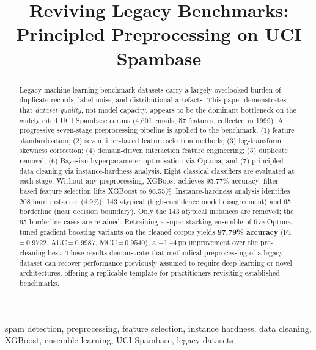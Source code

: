 \documentclass[conference]{IEEEtran}
\begin{document}
\title{Reviving Legacy Benchmarks: Principled Preprocessing on UCI Spambase }

\author{%
}

\maketitle

\begin{abstract}
Legacy machine learning benchmark datasets carry a largely
overlooked burden of duplicate records, label noise, and distributional artefacts. This paper demonstrates that \emph{dataset quality}, not model capacity, appears to be the dominant bottleneck on
the widely cited UCI Spambase corpus (4,601 emails, 57
features, collected in 1999). A progressive seven-stage
preprocessing pipeline is applied to the benchmark. (1) feature
standardisation; (2) seven filter-based feature selection
methods; (3) log-transform skewness correction; (4) domain-driven
interaction feature engineering; (5) duplicate removal; (6)
Bayesian hyperparameter optimisation via Optuna; and (7)
principled data cleaning via instance-hardness analysis. Eight
classical classifiers are evaluated at each stage. Without any
preprocessing, XGBoost achieves 95.77\% accuracy; filter-based feature selection lifts
XGBoost to 96.55\%. Instance-hardness analysis identifies 208
hard instances (4.9\%): 143 atypical (high-confidence model
disagreement) and 65 borderline (near decision boundary).
Only the 143 atypical instances are removed; the 65 borderline
cases are retained. Retraining a super-stacking ensemble of five
Optuna-tuned gradient boosting variants on the cleaned corpus
yields \textbf{97.79\% accuracy} (F1\,=\,0.9722,
AUC\,=\,0.9987, MCC\,=\,0.9540), a +1.44\,pp improvement
over the pre-cleaning best. These results
demonstrate that methodical preprocessing of a legacy dataset
can recover performance previously assumed to require deep
learning or novel architectures, offering a replicable template
for practitioners revisiting established benchmarks.
\end{abstract}

\begin{IEEEkeywords}
spam detection, preprocessing, feature selection, instance
hardness, data cleaning, XGBoost, ensemble learning,
UCI Spambase, legacy datasets
\end{IEEEkeywords}
\end{document}
